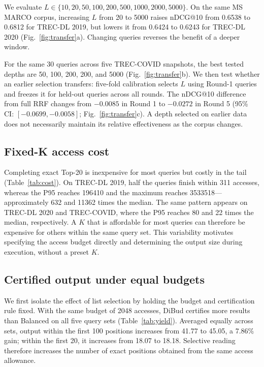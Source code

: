 \label{transfer-of-fixed-depths}

We evaluate \(L\in\{10,\allowbreak20,\allowbreak50,\allowbreak100,\allowbreak200,\allowbreak500,\allowbreak1000,\allowbreak2000,\allowbreak5000\}\). On the same MS MARCO corpus, increasing \(L\) from 20 to 5000 raises nDCG@10 from 0.6538 to 0.6812 for TREC-DL 2019, but lowers it from 0.6424 to 0.6243 for TREC-DL 2020 (Fig.~\ref{fig:transfer}a). Changing queries reverses the benefit of a deeper window.

For the same 30 queries across five TREC-COVID snapshots, the best tested depths are 50, 100, 200, 200, and 5000 (Fig.~\ref{fig:transfer}b). We then test whether an earlier selection transfers: five-fold calibration selects \(L\) using Round-1 queries and freezes it for held-out queries across all rounds. The nDCG@10 difference from full RRF changes from \(-0.0085\) in Round 1 to \(-0.0272\) in Round 5 (95\% CI: \([-0.0699,-0.0058]\); Fig.~\ref{fig:transfer}c). A depth selected on earlier data does not necessarily maintain its relative effectiveness as the corpus changes.

\subsection{Fixed-K access cost}

\label{fixed-k-access-cost}

Completing exact Top-20 is inexpensive for most queries but costly in the tail (Table~\ref{tab:cost}). On TREC-DL 2019, half the queries finish within 311 accesses, whereas the P95 reaches 196410 and the maximum reaches 3533518---approximately 632 and 11362 times the median. The same pattern appears on TREC-DL 2020 and TREC-COVID, where the P95 reaches 80 and 22 times the median, respectively. A \(K\) that is affordable for most queries can therefore be expensive for others within the same query set. This variability motivates specifying the access budget directly and determining the output size during execution, without a preset \(K\).



\subsection{Certified output under equal budgets}

\label{certified-output-under-equal-budgets}

We first isolate the effect of list selection by holding the budget and certification rule fixed. With the same budget of 2048 accesses, DiBud certifies more results than Balanced on all five query sets (Table~\ref{tab:yield}). Averaged equally across sets, output within the first 100 positions increases from 41.77 to 45.05, a 7.86\% gain; within the first 20, it increases from 18.07 to 18.18. Selective reading therefore increases the number of exact positions obtained from the same access allowance.

